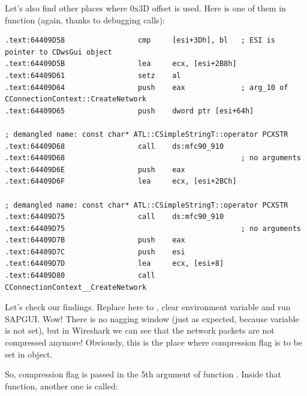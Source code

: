 {Let's also find other places where 0x3D offset is used. 
Here is one of them in  function (again, thanks to debugging calls):}

\begin{lstlisting}
.text:64409D58                 cmp     [esi+3Dh], bl   ; ESI is pointer to CDwsGui object
.text:64409D5B                 lea     ecx, [esi+2B8h]
.text:64409D61                 setz    al
.text:64409D64                 push    eax             ; arg_10 of CConnectionContext::CreateNetwork
.text:64409D65                 push    dword ptr [esi+64h]

; demangled name: const char* ATL::CSimpleStringT::operator PCXSTR 
.text:64409D68                 call    ds:mfc90_910
.text:64409D68                                         ; no arguments
.text:64409D6E                 push    eax
.text:64409D6F                 lea     ecx, [esi+2BCh]

; demangled name: const char* ATL::CSimpleStringT::operator PCXSTR 
.text:64409D75                 call    ds:mfc90_910
.text:64409D75                                         ; no arguments
.text:64409D7B                 push    eax
.text:64409D7C                 push    esi
.text:64409D7D                 lea     ecx, [esi+8]
.text:64409D80                 call    CConnectionContext__CreateNetwork
\end{lstlisting}

{Let's check our findings. Replace  here to , clear \TDWNC 
environment variable and run SAPGUI. Wow! There is no nagging window (just as expected, 
because variable is not set), but in Wireshark we can see that the network packets are not compressed anymore! 
Obviously, this is the place where compression flag is to be set in  object.}

{So, compression flag is passed in the 5th argument of function . 
Inside that function, another one is called:}

